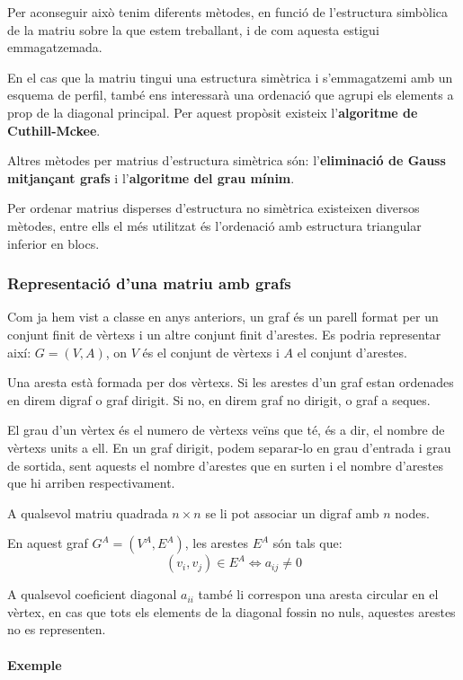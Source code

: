\documentclass[11pt,a4paper,twoside]{report}
\begin{document}
Per aconseguir això tenim diferents mètodes, en funció de l'estructura simbòlica de la matriu sobre la que estem treballant, i de com aquesta estigui emmagatzemada.
 
En el cas que la matriu tingui una estructura simètrica i s'emmagatzemi amb un esquema de perfil, també ens interessarà una ordenació que agrupi els elements a prop de la diagonal principal. Per aquest propòsit existeix l'\textbf{algoritme de Cuthill-Mckee}.

Altres mètodes per matrius d'estructura simètrica són: l'\textbf{eliminació de Gauss mitjançant grafs} i l'\textbf{algoritme del grau mínim}.


Per ordenar matrius disperses d'estructura no simètrica existeixen diversos mètodes, entre ells el més utilitzat és l'ordenació amb estructura triangular inferior en blocs.

\subsubsection{Representació d'una matriu amb grafs}

Com ja hem vist a classe en anys anteriors, un graf és un parell format per un conjunt finit de vèrtexs i un altre conjunt finit d'arestes. Es podria representar així: $G = (V,A)$, on $V$ és el conjunt de vèrtexs i $A$ el conjunt d'arestes.

Una aresta està formada per dos vèrtexs. Si les arestes d'un graf estan ordenades en direm digraf o graf dirigit. Si no, en direm graf no dirigit, o graf a seques.

El grau d'un vèrtex és el numero de vèrtexs veïns que té, és a dir, el nombre de vèrtexs units a ell. En un graf dirigit, podem separar-lo en grau d'entrada i grau de sortida, sent aquests el nombre d'arestes que en surten i el nombre d'arestes que hi arriben respectivament.


A qualsevol matriu quadrada $n \times n$ se li pot associar un digraf amb $n$ nodes.

En aquest graf $G^A = (V^A, E^A)$, les arestes $E^A$ són tals que:
\[(v_i,v_j) \in E^A \Leftrightarrow	a_{ij} \neq 0\]

A qualsevol coeficient diagonal $a_{ii}$ també li correspon una aresta circular en el vèrtex, en cas que tots els elements de la diagonal fossin no nuls, aquestes arestes no es representen.


\paragraph*{Exemple}
\end{document}

